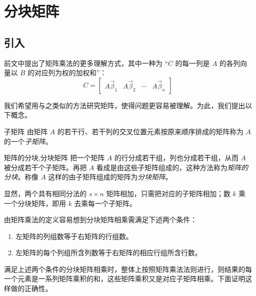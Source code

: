 
\section{分块矩阵}

\subsection{引入}

前文中提出了矩阵乘法的更多理解方式，其中一种为 “$C$ 的每一列是 $A$ 的各列向量以 $B$ 的对应列为权的加权和”：
$$
C = \begin{bmatrix} A \vec \beta_1 & A \vec \beta_2 & \cdots & A \vec \beta_n \end{bmatrix}
$$

我们希望用与之类似的方法研究矩阵，使得问题更容易被理解。为此，我们提出以下概念。

\begin{definition}{子矩阵}
	由矩阵 $A$ 的若干行、若干列的交叉位置元素按原来顺序排成的矩阵称为 $A$ 的一个\emph{子矩阵}。
\end{definition}

\begin{definition}{矩阵的分块,分块矩阵}
	把一个矩阵 $A$ 的行分成若干组，列也分成若干组，从而 $A$ 被分成若干个子矩阵。再把 $A$ 看成是由这些子矩阵组成的，这种方法称为\emph{矩阵的分块}。称像 $A$ 这样的由子矩阵组成的矩阵为\emph{分块矩阵}。
\end{definition}

显然，两个具有相同分法的 $s \times n$ 矩阵相加，只需把对应的子矩阵相加；数 $k$ 乘一个分块矩阵，即用 $k$ 去乘每一个子矩阵。

由矩阵乘法的定义容易想到分块矩阵相乘需满足下述两个条件：

\begin{enumerate}
	\item 左矩阵的列组数等于右矩阵的行组数。
	\item 左矩阵的每个列组所含列数等于右矩阵的相应行组所含行数。
\end{enumerate}

满足上述两个条件的分块矩阵相乘时，整体上按照矩阵乘法法则进行，则结果的每一个元素是一系列矩阵乘积的和，这些矩阵乘积又是对应子矩阵相乘。下面证明这样做的正确性。

